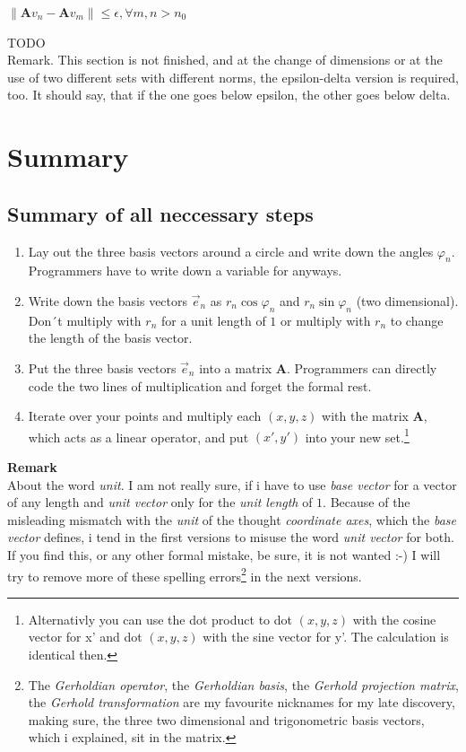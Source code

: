 \documentclass[a4paper]{article}
\begin{document}
\begin{center}
$\|\boldsymbol{A}v_{n} - \boldsymbol{A}v_{m}\| \leq \epsilon,  \forall m,n > n_{0}$
\end{center}

TODO\\

Remark. This section is not finished, and at the change of dimensions or at the use of two different sets with different norms, the epsilon-delta version is required, too. It should say, that if the one goes below epsilon, the other goes below delta.\\




\section{Summary}

\subsection{Summary of all neccessary steps}
\begin{enumerate}
\item Lay out the three basis vectors around a circle and write down the angles $\varphi_{n}$. Programmers have to write down a variable for anyways.
\item Write down the basis vectors $\vec{e}_{n}$ as $r_{n} \cos \varphi_{n}$ and $r_{n} \sin \varphi_{n}$ (two dimensional). Don´t multiply with $r_{n}$ for a unit length of $1$ or multiply with $r_{n}$ to change the length of the basis vector.
\item Put the three basis vectors $\vec{e}_{n}$ into a matrix $\boldsymbol{A}$. Programmers can directly code the two lines of multiplication and forget the formal rest.
\item Iterate over your points and multiply each $(x,y,z)$ with the matrix $\boldsymbol{A}$, which acts as a linear operator, and put $(x',y')$ into your new set.\footnote{Alternativly you can use the dot product to dot $(x,y,z)$ with the cosine vector for x' and dot $(x,y,z)$ with the sine vector for y'. The calculation is identical then.}
\end{enumerate}

\textbf{Remark}\\
About the word \emph{unit}. I am not really sure, if i have to use \emph{base vector} for a vector of any length and \emph{unit vector} only for the \emph{unit length} of $1$. Because of the misleading mismatch with the \emph{unit} of the thought \emph{coordinate axes}, which the \emph{base vector} defines, i tend in the first versions to misuse the word \emph{unit vector} for both. If you find this, or any other formal mistake, be sure, it is not wanted :-) I will try to remove more of these spelling errors\footnote{The \emph{Gerholdian operator}, the \emph{Gerholdian basis}, the \emph{Gerhold projection matrix}, the \emph{Gerhold transformation} are my favourite nicknames for my late discovery, making sure, the three two dimensional and trigonometric basis vectors, which i explained, sit in the matrix.} in the next versions.
\end{document}
